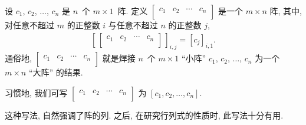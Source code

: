 \documentclass[%
    UTF8,%
    fontset=none,%
    punct=kaiming,%
    zihao=-4,%
    a4paper,%
    oneside,%
]{ctexbook}
\begin{document}
\begin{definition}
    设 \(c_1\), \(c_2\), \(\dots\), \(c_n\)
    是 \(n\)~个 \(m \times 1\)~阵.
    定义
    \(
    \begin{bmatrix}
        c_1 & c_2 & \cdots & c_n \\
    \end{bmatrix}
    \)
    是一个 \(m \times n\) 阵,
    其中, 对任意不超过 \(m\) 的正整数 \(i\)
    与任意不超过 \(n\) 的正整数 \(j\),
    \begin{align*}
        \left[\,
            \begin{bmatrix}
                c_1 & c_2 & \cdots & c_n \\
            \end{bmatrix}
            \,\right]_{i,j}
        = [c_j]_{i,1}.
    \end{align*}
    通俗地,
    \(
    \begin{bmatrix}
        c_1 & c_2 & \cdots & c_n \\
    \end{bmatrix}
    \)
    就是焊接 \(n\)~个 \(m \times 1\) ``小阵''
    \(c_1\), \(c_2\), \(\dots\), \(c_n\)
    为一个 \(m \times n\) ``大阵''
    的结果.

    习惯地, 我们可写
    \(
    \begin{bmatrix}
        c_1 & c_2 & \cdots & c_n \\
    \end{bmatrix}
    \)
    为 \([c_1, c_2, \dots, c_n]\).
\end{definition}

这种写法, 自然强调了阵的列.
之后, 在研究行列式的性质时, 此写法十分有用.
\end{document}
